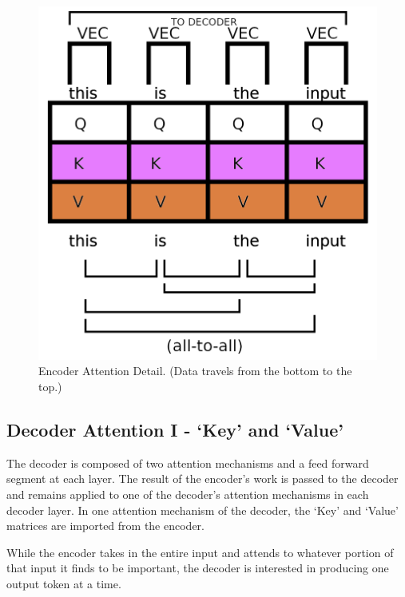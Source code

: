 \begin{figure}[H]
	\begin{center}
		
		
		\includegraphics[scale=0.75]{diagram-graph-encoder-flow-a}
	\end{center}
	\caption[Encoder Attention Detail]{Encoder Attention Detail. (Data travels from the bottom to the top.)}
	
	
\end{figure}

\subsection{Decoder Attention I - `Key' and `Value'}
The decoder is composed of two attention mechanisms and a feed forward segment at each layer. The result of the encoder's work is passed to the decoder and remains applied to one of the decoder's attention mechanisms in each decoder layer. In one attention mechanism of the decoder, the `Key' and `Value' matrices are imported from the encoder. 

While the encoder takes in the entire input and attends to whatever portion of that input it finds to be important, the decoder is interested in producing one output token at a time. 


